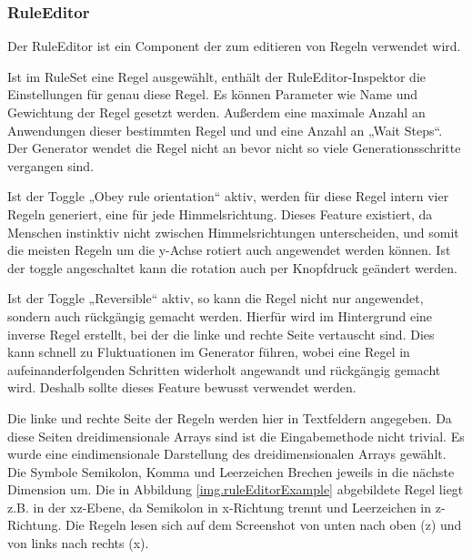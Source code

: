 \subsubsection{RuleEditor}\label{sss.ruleEditor}

Der RuleEditor ist ein Component der zum editieren von Regeln verwendet wird. 


Ist im RuleSet eine Regel ausgewählt, enthält der RuleEditor-Inspektor die Einstellungen für genau diese Regel. Es können Parameter wie Name und Gewichtung der Regel gesetzt werden. Außerdem eine maximale Anzahl an Anwendungen dieser bestimmten Regel und und eine Anzahl an „Wait Steps“. Der Generator wendet die Regel nicht an bevor nicht so viele Generationsschritte vergangen sind.

Ist der Toggle „Obey rule orientation“ aktiv, werden für diese Regel intern vier Regeln generiert, eine für jede Himmelsrichtung. Dieses Feature existiert, da Menschen instinktiv nicht zwischen Himmelsrichtungen unterscheiden, und somit die meisten Regeln um die y-Achse rotiert auch angewendet werden können. Ist der toggle angeschaltet kann die rotation auch per Knopfdruck geändert werden. 

Ist der Toggle „Reversible“ aktiv, so kann die Regel nicht nur angewendet, sondern auch rückgängig gemacht werden. Hierfür wird im Hintergrund eine inverse Regel erstellt, bei der die linke und rechte Seite vertauscht sind. Dies kann schnell zu Fluktuationen im Generator führen, wobei eine Regel in aufeinanderfolgenden Schritten widerholt angewandt und rückgängig gemacht wird. Deshalb sollte dieses Feature bewusst verwendet werden.

Die linke und rechte Seite der Regeln werden hier in Textfeldern angegeben. Da diese Seiten  dreidimensionale Arrays sind ist die Eingabemethode nicht trivial. Es wurde eine eindimensionale Darstellung des dreidimensionalen Arrays gewählt. Die Symbole Semikolon, Komma und Leerzeichen Brechen jeweils in die nächste Dimension um. Die in Abbildung \ref{img.ruleEditorExample} abgebildete Regel liegt z.B. in der xz-Ebene, da Semikolon in x-Richtung trennt und Leerzeichen in z-Richtung. Die Regeln lesen sich auf dem Screenshot von unten nach oben (z) und von links nach rechts (x).


